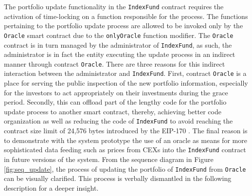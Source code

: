 The portfolio update functionality in the \texttt{IndexFund} contract requires the activation of time-locking on a function responsible for the process. The functions pertaining to the portfolio update process are allowed to be invoked only by the \texttt{Oracle} smart contract due to the \texttt{onlyOracle} function modifier.  
The \texttt{Oracle} contract is in turn managed by the administrator of \texttt{IndexFund}, as such, the administrator is in fact the entity executing the update process in an indirect manner through contract \texttt{Oracle}. There are three reasons for this indirect interaction between the administrator and \texttt{IndexFund}. First, contract \texttt{Oracle} is a place for serving the public inspection of the new portfolio information, especially for the investors to act appropriately on their investments during the grace period. Secondly, this can offload part of the lengthy code for the portfolio update process to another smart contract, thereby, achieving better code organization as well as reducing the code of \texttt{IndexFund} to avoid reaching the contract size limit of 24,576 bytes introduced by the EIP-170 \cite{eip170}. The final reason is to demonstrate with the system prototype the use of an oracle as means for more sophisticated data feeding such as prices from CEXs into the \texttt{IndexFund} contract in future versions of the system. From the sequence diagram in Figure \ref{fig:seq_update}, the process of updating the portfolio of \texttt{IndexFund} from \texttt{Oracle} can be visually clarified. This process is verbally dismantled in the following description for a deeper insight.

